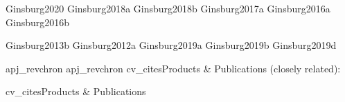 \documentclass[12pt]{article}
\begin{document}
%

\nocite{biba}{Ginsburg2020}
\nocite{biba}{Ginsburg2018a}
\nocite{biba}{Ginsburg2018b}
\nocite{biba}{Ginsburg2017a}
\nocite{biba}{Ginsburg2016a}
\nocite{biba}{Ginsburg2016b}

\nocite{bibb}{Ginsburg2013b}
\nocite{bibb}{Ginsburg2012a}
\nocite{bibb}{Ginsburg2019a}
\nocite{bibb}{Ginsburg2019b}
\nocite{bibb}{Ginsburg2019d}

{apj_revchron}
{apj_revchron}
%
%
{cv_cites}{Products \& Publications (closely related):}
%


{cv_cites}{Products \& Publications}

\vfill  
\nopagebreak



%


% 
% 
% 
% 
% 
% 
% 
% 
% 
% 
% 
% 
% 
% 
% 
\end{document}
